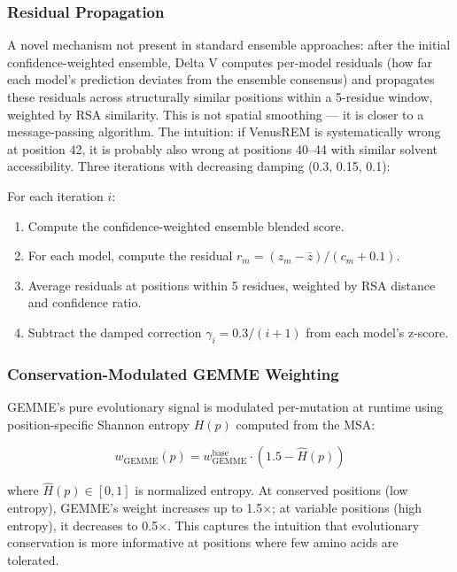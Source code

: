 \documentclass[11pt,a4paper]{article}
\begin{document}
\subsubsection{Residual Propagation}

A novel mechanism not present in standard ensemble approaches: after the initial confidence-weighted ensemble, Delta V computes per-model residuals (how far each model's prediction deviates from the ensemble consensus) and propagates these residuals across structurally similar positions within a 5-residue window, weighted by RSA similarity. This is not spatial smoothing --- it is closer to a message-passing algorithm. The intuition: if VenusREM is systematically wrong at position 42, it is probably also wrong at positions 40--44 with similar solvent accessibility. Three iterations with decreasing damping (0.3, 0.15, 0.1):

For each iteration $i$:
\begin{enumerate}
    \item Compute the confidence-weighted ensemble blended score.
    \item For each model, compute the residual $r_m = (z_m - \bar{z}) / (c_m + 0.1)$.
    \item Average residuals at positions within 5 residues, weighted by RSA distance and confidence ratio.
    \item Subtract the damped correction $\gamma_i = 0.3 / (i+1)$ from each model's z-score.
\end{enumerate}

\subsubsection{Conservation-Modulated GEMME Weighting}

GEMME's pure evolutionary signal is modulated per-mutation at runtime using position-specific Shannon entropy $H(p)$ computed from the MSA:

\begin{equation}
    w_{\text{GEMME}}(p) = w^{\text{base}}_{\text{GEMME}} \cdot (1.5 - \hat{H}(p))
\end{equation}

where $\hat{H}(p) \in [0, 1]$ is normalized entropy. At conserved positions (low entropy), GEMME's weight increases up to 1.5$\times$; at variable positions (high entropy), it decreases to 0.5$\times$. This captures the intuition that evolutionary conservation is more informative at positions where few amino acids are tolerated.
\end{document}
